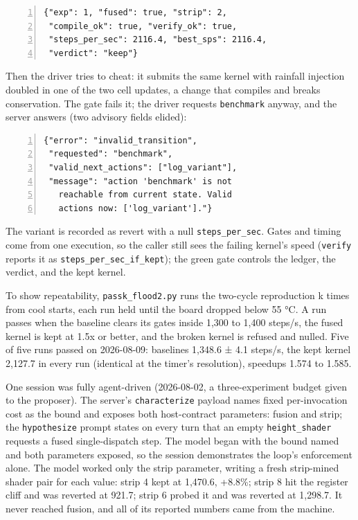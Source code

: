 \documentclass[conference]{IEEEtran}
\begin{document}
\medskip\noindent\begin{minipage}{\linewidth}
\begin{Verbatim}[frame=single,numbers=left,numbersep=3pt,framesep=1.6mm,fontsize=\scriptsize]
{"exp": 1, "fused": true, "strip": 2,
 "compile_ok": true, "verify_ok": true,
 "steps_per_sec": 2116.4, "best_sps": 2116.4,
 "verdict": "keep"}
\end{Verbatim}
\end{minipage}\medskip

Then the driver tries to cheat: it submits the same kernel with rainfall
injection doubled in one of the two cell updates, a change that compiles
and breaks conservation. The gate fails it; the driver requests
\texttt{benchmark} anyway, and the server answers (two advisory fields
elided):

\medskip\noindent\begin{minipage}{\linewidth}
\begin{Verbatim}[frame=single,numbers=left,numbersep=3pt,framesep=1.6mm,fontsize=\scriptsize]
{"error": "invalid_transition",
 "requested": "benchmark",
 "valid_next_actions": ["log_variant"],
 "message": "action 'benchmark' is not
   reachable from current state. Valid
   actions now: ['log_variant']."}
\end{Verbatim}
\end{minipage}\medskip

The variant is recorded as revert with a null \texttt{steps\_per\_sec}.
Gates and timing come from one execution, so the caller still sees the
failing kernel's speed (\texttt{verify} reports it as
\texttt{steps\_per\_sec\_if\_kept}); the green gate controls the ledger,
the verdict, and the kept kernel.

To show repeatability, \texttt{passk\_flood2.py} runs the two-cycle
reproduction k times from cool starts, each run held until the board
dropped below 55 °C. A run passes when the baseline clears its gates
inside 1,300 to 1,400 steps/s, the fused kernel is kept at 1.5x or
better, and the broken kernel is refused and nulled. Five of five runs
passed on 2026-08-09: baselines 1,348.6 ± 4.1 steps/s, the kept kernel
2,127.7 in every run (identical at the timer's resolution), speedups
1.574 to 1.585.

One session was fully agent-driven (2026-08-02, a three-experiment
budget given to the proposer). The server's \texttt{characterize}
payload names fixed per-invocation cost as the bound and exposes both
host-contract parameters: fusion and strip; the \texttt{hypothesize}
prompt states on every turn that an empty \texttt{height\_shader}
requests a fused single-dispatch step. The model began with the bound
named and both parameters exposed, so the session demonstrates the
loop's enforcement alone. The model worked only the strip parameter,
writing a fresh strip-mined shader pair for each value: strip 4 kept at
1,470.6, +8.8\%; strip 8 hit the register cliff and was reverted at
921.7; strip 6 probed it and was reverted at 1,298.7. It never reached
fusion, and all of its reported numbers came from the machine.
\end{document}
